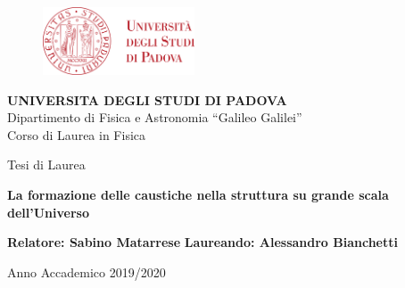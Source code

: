 \begin{titlepage}
    \begin{center}

        \begin{figure}[H]
            \centering
            \includegraphics[width=0.4\textwidth]{unipd_logo.png}
        \end{figure}

        \vspace{0.5cm}

        \LARGE
        \textbf{UNIVERSITA DEGLI STUDI DI PADOVA}\\
        Dipartimento di Fisica e Astronomia “Galileo Galilei”\\
        Corso di Laurea in Fisica\\

        \vspace{1cm}

        Tesi di Laurea
        \vspace*{1.5cm}

        \Huge
        \textbf{La formazione delle caustiche nella struttura su grande scala dell'Universo}
        \vspace{1.5cm}

    \end{center}

    \vspace{5cm}

    
    \normalsize
    \textbf{Relatore: Sabino Matarrese} \hspace{4cm} \textbf{Laureando: Alessandro Bianchetti}
    \vspace{3cm}

    \LARGE
    \begin{center}
        Anno Accademico 2019/2020
    \end{center}

    

    
\end{titlepage}